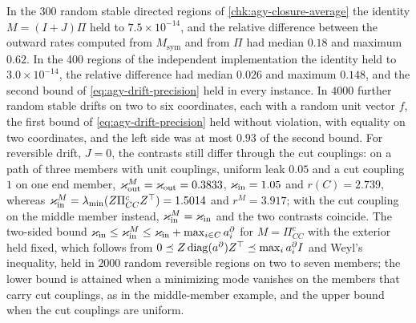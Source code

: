 \begin{numcheck}\label{chk:agy-drift-precision}
In the 300 random stable directed regions of \cref{chk:agy-closure-average} the identity $M=(I+J)\Pi$ held to $7.5\times10^{-14}$, and the relative difference between the outward rates computed from $M_{\mathrm{sym}}$ and from $\Pi$ had median $0.18$ and maximum $0.62$. In the 400 regions of the independent implementation the identity held to $3.0\times10^{-14}$, the relative difference had median $0.026$ and maximum $0.148$, and the second bound of \eqref{eq:agy-drift-precision} held in every instance. In $4000$ further random stable drifts on two to six coordinates, each with a random unit vector $f$, the first bound of \eqref{eq:agy-drift-precision} held without violation, with equality on two coordinates, and the left side was at most $0.93$ of the second bound. For reversible drift, $J=0$, the contrasts still differ through the cut couplings: on a path of three members with unit couplings, uniform leak $0.05$ and a cut coupling $1$ on one end member, $\varkappa_{\mathrm{out}}^M=\varkappa_{\mathrm{out}}=0.3833$, $\varkappa_{\mathrm{in}}=1.05$ and $r(C)=2.739$, whereas $\varkappa_{\mathrm{in}}^M=\lambda_{\min}(Z\Pi^c_{CC}Z^\top)=1.5014$ and $r^M=3.917$; with the cut coupling on the middle member instead, $\varkappa_{\mathrm{in}}^M=\varkappa_{\mathrm{in}}$ and the two contrasts coincide. The two-sided bound $\varkappa_{\mathrm{in}}\le\varkappa_{\mathrm{in}}^M\le\varkappa_{\mathrm{in}}+\max_{i\in C}a^\partial_i$ for $M=\Pi^c_{CC}$ with the exterior held fixed, which follows from $0\preceq Z\operatorname{diag}(a^\partial)Z^\top\preceq\max_ia^\partial_iI$ and Weyl's inequality, held in $2000$ random reversible regions on two to seven members; the lower bound is attained when a minimizing mode vanishes on the members that carry cut couplings, as in the middle-member example, and the upper bound when the cut couplings are uniform.
\end{numcheck}

